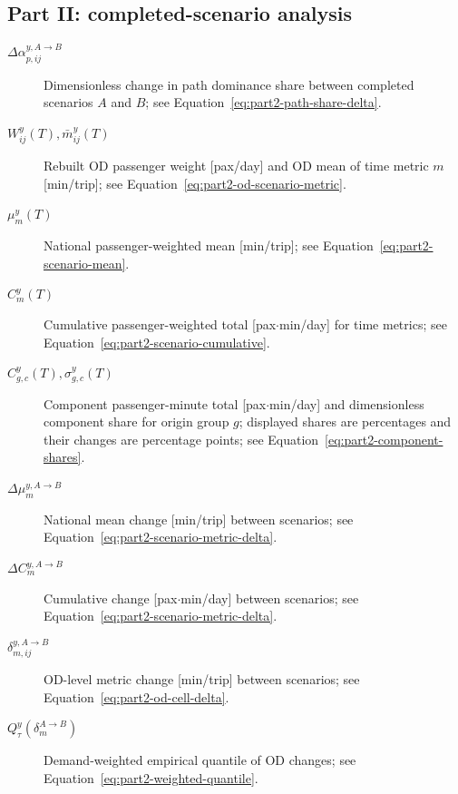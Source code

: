 \documentclass[preprint,12pt]{elsarticle}
\begin{document}
\subsection*{Part II: completed-scenario analysis}
\begin{description}
    \item[$\Delta\alpha_{p,ij}^{y,A\to B}$] Dimensionless change in path dominance share between completed scenarios \(A\) and \(B\); see Equation~\eqref{eq:part2-path-share-delta}.
    \item[$W_{ij}^y(T),\bar m_{ij}^y(T)$] Rebuilt OD passenger weight [pax/day] and OD mean of time metric \(m\) [min/trip]; see Equation~\eqref{eq:part2-od-scenario-metric}.
    \item[$\mu_m^y(T)$] National passenger-weighted mean [min/trip]; see Equation~\eqref{eq:part2-scenario-mean}.
    \item[$C_m^y(T)$] Cumulative passenger-weighted total [pax\(\cdot\)min/day] for time metrics; see Equation~\eqref{eq:part2-scenario-cumulative}.
    \item[$C_{g,c}^y(T),\sigma_{g,c}^y(T)$] Component passenger-minute total [pax\(\cdot\)min/day] and dimensionless component share for origin group \(g\); displayed shares are percentages and their changes are percentage points; see Equation~\eqref{eq:part2-component-shares}.
    \item[$\Delta\mu_m^{y,A\to B}$] National mean change [min/trip] between scenarios; see Equation~\eqref{eq:part2-scenario-metric-delta}.
    \item[$\Delta C_m^{y,A\to B}$] Cumulative change [pax\(\cdot\)min/day] between scenarios; see Equation~\eqref{eq:part2-scenario-metric-delta}.
    \item[$\delta_{m,ij}^{y,A\to B}$] OD-level metric change [min/trip] between scenarios; see Equation~\eqref{eq:part2-od-cell-delta}.
    \item[$Q_\tau^y(\delta_m^{A\to B})$] Demand-weighted empirical quantile of OD changes; see Equation~\eqref{eq:part2-weighted-quantile}.
\end{description}

\clearpage
{}
\renewcommand{\refname}{Bibliography}
\begingroup
\small

\endgroup

\clearpage
\thispagestyle{plain}
\end{document}
